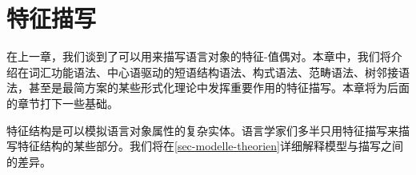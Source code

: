 

\chapter{特征描写}
\label{chap-feature-descriptions}

在上一章，我们谈到了可以用来描写语言对象的特征-值偶对。本章中，我们将介绍在词汇功能语法、中心语驱动的短语结构语法、构式语法、范畴语法、树邻接语法，甚至是最简方案的某些形式化理论\citep{Veenstra98a}中发挥重要作用的特征描写。本章将为后面的章节打下一些基础。

特征结构是可以模拟语言对象属性的复杂实体。语言学家们多半只用特征描写来描写特征结构的某些部分。我们将在\ref{sec-modelle-theorien}详细解释模型与描写之间的差异。


